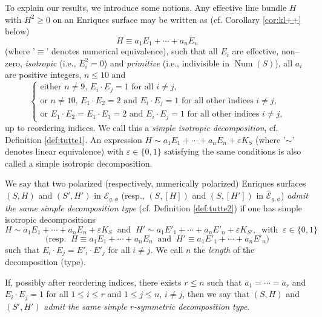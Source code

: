 \documentclass[11pt]{amsart}
\theoremstyle{definition}
\def\E{{\mathcal E}}
\def\Num{\operatorname{Num}}
\renewcommand{\leq}{\leqslant}
\begin{document}
To  explain our results,  we introduce  some notions.  Any effective line bundle $H$
with $H^ 2\geqslant 0$ on an Enriques surface
may be written as  (cf. Corollary \ref{cor:kl++} below) 
\begin {equation}\label{eq:ssid}  H \equiv a_1E_1+\cdots+a_nE_{n}\end{equation}
(where '$\equiv$' denotes numerical equivalence), such that  all $E_i$ are effective, non--zero, \emph{isotropic} (i.e., $E_i^2=0$) and \emph{primitive} (i.e., indivisible in $\Num(S)$), all $a_i$ are positive integers, $n \leqslant 10$ and  
\begin{equation}
\begin{cases}
 \mbox{either  $n \neq 9$,  $E_i \cdot E_j=1$ for all $i \neq j$,} \\
\label{eq:int2-int} 
\mbox{or  $n \neq 10$,  $E_1 \cdot E_2=2$ and $E_i \cdot E_j=1$ for all other indices
  $i \neq j$,} \\
 \mbox{or  $E_1 \cdot E_2=E_1 \cdot E_3=2$ and $E_i \cdot E_j=1$ for all
  other indices $i \neq j$,} 
\end{cases}
\end{equation}
up to reordering indices.
We call this a {\it simple isotropic decomposition},  cf. Definition \ref{def:tutte1}.  
An expression $H \sim a_1E_1+\cdots+a_nE_{n}+\varepsilon K_S$ 
(where '$\sim$' denotes linear equivalence) with $\varepsilon \in \{0,1\}$ satisfying the same conditions is also called a  simple isotropic decomposition. 


We say that two polarized (respectively, numerically polarized) Enriques surfaces $(S,H)$ and $(S',H')$ in $\E_{g,\phi}$ (resp., $(S,[H])$ and $(S, [H'])$ in $\widehat{\E}_{g,\phi}$) {\em  admit the same  simple decomposition type}  (cf. Definition \ref{def:tutte2})  if one 
 has simple isotropic decompositions 
\begin{equation}\label{eq:sdt}  H \sim a_1 E_1+\cdots +a_nE_n+\varepsilon K_S
\; \; \mbox{and} \; \; H' \sim a_1 E'_1+\cdots +a_nE'_n+\varepsilon K_{S'}, \; \;  \mbox{with} \; \; \varepsilon   \in \{0,1\} \end{equation}
\[  \mbox {(resp.}\;\; H \equiv a_1 E_1+\cdots +a_nE_n
\; \; \mbox{and} \; \; H' \equiv a_1 E'_1+\cdots +a_nE'_n)\]
such that $E_i \cdot E_j=E'_i \cdot E'_j$ for all $i \neq j$.
We call $n$ the {\em length} of the decomposition  (type). 
  
If, possibly after reordering indices, there exists $r \leq n$ such
that $a_1=\cdots=a_r$ and $E_i \cdot E_j=1$ for 
 all $1 \leq i \leq r$ and $1 \leq j \leq n$, $i\neq j$,
 then we say that $(S,H)$ and $(S',H')$
{\em admit the same simple $r$-symmetric decomposition type}.
\end{document}
